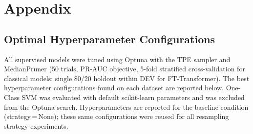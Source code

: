 ﻿\appendix
\chapter{Appendix}
\label{chapter:annex}

\section{Optimal Hyperparameter Configurations}
\label{appendixA}

All supervised models were tuned using Optuna with the TPE sampler and MedianPruner (50 trials, PR-AUC objective, 5-fold stratified cross-validation for classical models; single 80/20 holdout within DEV for FT-Transformer). The best hyperparameter configurations found on each dataset are reported below. One-Class SVM was evaluated with default scikit-learn parameters and was excluded from the Optuna search. Hyperparameters are reported for the baseline condition (strategy\,=\,None); these same configurations were reused for all resampling strategy experiments.

